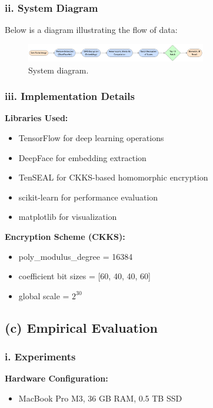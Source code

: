 \documentclass[12pt,a4paper]{article}
\begin{document}
\subsubsection*{ii. System Diagram}
Below is a diagram illustrating the flow of data:

\begin{figure}[H]
\centering
\includegraphics[width=0.7\textwidth]{./elements/System diagram.png}
\caption{System diagram.}
\label{fig:system_diagram}
\end{figure}

\subsubsection*{iii. Implementation Details}
\textbf{Libraries Used:}
\begin{itemize}
    \item TensorFlow for deep learning operations
    \item DeepFace for embedding extraction
    \item TenSEAL for CKKS-based homomorphic encryption
    \item scikit-learn for performance evaluation
    \item matplotlib for visualization
\end{itemize}

\textbf{Encryption Scheme (CKKS):}
\begin{itemize}
    \item poly\_modulus\_degree = 16384
    \item coefficient bit sizes = [60, 40, 40, 60]
    \item global scale = \(2^{30}\)
\end{itemize}

\subsection{(c) Empirical Evaluation}

\subsubsection*{i. Experiments}
\textbf{Hardware Configuration:}
\begin{itemize}
    \item MacBook Pro M3, 36 GB RAM, 0.5 TB SSD
\end{itemize}
\end{document}
